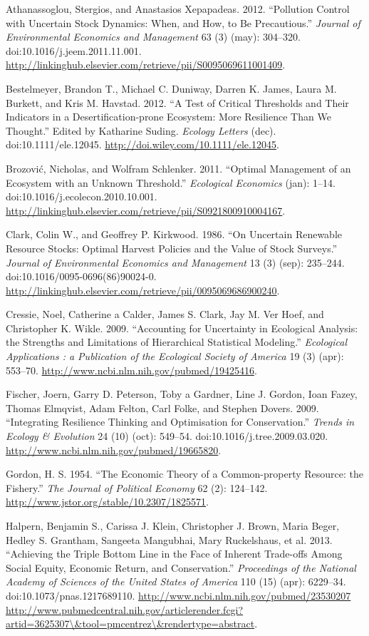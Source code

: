 \documentclass[author-year, review]{elsarticle} %
\begin{document}
Athanassoglou, Stergios, and Anastasios Xepapadeas. 2012. ``Pollution
Control with Uncertain Stock Dynamics: When, and How, to Be
Precautious.'' \emph{Journal of Environmental Economics and Management}
63 (3) (may): 304--320. doi:10.1016/j.jeem.2011.11.001.
\url{http://linkinghub.elsevier.com/retrieve/pii/S0095069611001409}.

Bestelmeyer, Brandon T., Michael C. Duniway, Darren K. James, Laura M.
Burkett, and Kris M. Havstad. 2012. ``A Test of Critical Thresholds and
Their Indicators in a Desertification-prone Ecosystem: More Resilience
Than We Thought.'' Edited by Katharine Suding. \emph{Ecology Letters}
(dec). doi:10.1111/ele.12045.
\url{http://doi.wiley.com/10.1111/ele.12045}.

Brozović, Nicholas, and Wolfram Schlenker. 2011. ``Optimal Management of
an Ecosystem with an Unknown Threshold.'' \emph{Ecological Economics}
(jan): 1--14. doi:10.1016/j.ecolecon.2010.10.001.
\url{http://linkinghub.elsevier.com/retrieve/pii/S0921800910004167}.

Clark, Colin W., and Geoffrey P. Kirkwood. 1986. ``On Uncertain
Renewable Resource Stocks: Optimal Harvest Policies and the Value of
Stock Surveys.'' \emph{Journal of Environmental Economics and
Management} 13 (3) (sep): 235--244. doi:10.1016/0095-0696(86)90024-0.
\url{http://linkinghub.elsevier.com/retrieve/pii/0095069686900240}.

Cressie, Noel, Catherine a Calder, James S. Clark, Jay M. Ver Hoef, and
Christopher K. Wikle. 2009. ``Accounting for Uncertainty in Ecological
Analysis: the Strengths and Limitations of Hierarchical Statistical
Modeling.'' \emph{Ecological Applications : a Publication of the
Ecological Society of America} 19 (3) (apr): 553--70.
\url{http://www.ncbi.nlm.nih.gov/pubmed/19425416}.

Fischer, Joern, Garry D. Peterson, Toby a Gardner, Line J. Gordon, Ioan
Fazey, Thomas Elmqvist, Adam Felton, Carl Folke, and Stephen Dovers.
2009. ``Integrating Resilience Thinking and Optimisation for
Conservation.'' \emph{Trends in Ecology \& Evolution} 24 (10) (oct):
549--54. doi:10.1016/j.tree.2009.03.020.
\url{http://www.ncbi.nlm.nih.gov/pubmed/19665820}.

Gordon, H. S. 1954. ``The Economic Theory of a Common-property Resource:
the Fishery.'' \emph{The Journal of Political Economy} 62 (2): 124--142.
\url{http://www.jstor.org/stable/10.2307/1825571}.

Halpern, Benjamin S., Carissa J. Klein, Christopher J. Brown, Maria
Beger, Hedley S. Grantham, Sangeeta Mangubhai, Mary Ruckelshaus, et al.
2013. ``Achieving the Triple Bottom Line in the Face of Inherent
Trade-offs Among Social Equity, Economic Return, and Conservation.''
\emph{Proceedings of the National Academy of Sciences of the United
States of America} 110 (15) (apr): 6229--34.
doi:10.1073/pnas.1217689110.
\href{http://www.ncbi.nlm.nih.gov/pubmed/23530207 http://www.pubmedcentral.nih.gov/articlerender.fcgi?artid=3625307/\&tool=pmcentrez/\&rendertype=abstract}{http://www.ncbi.nlm.nih.gov/pubmed/23530207
http://www.pubmedcentral.nih.gov/articlerender.fcgi?artid=3625307\textbackslash{}\&tool=pmcentrez\textbackslash{}\&rendertype=abstract}.
\end{document}
